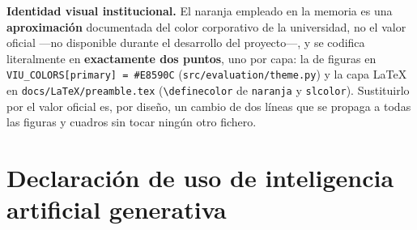 \begin{sloppypar}
\textbf{Identidad visual institucional.} El naranja empleado en la memoria es una
\textbf{aproximación} documentada del color corporativo de la universidad, no el valor
oficial ---no disponible durante el desarrollo del proyecto---, y se codifica literalmente
en \textbf{exactamente dos puntos}, uno por capa: la de figuras en
\texttt{VIU\_COLORS[\textquotedbl{}primary\textquotedbl{}] = \textquotedbl{}\#E8590C\textquotedbl{}}
(\texttt{src/\allowbreak{}evaluation/\allowbreak{}theme.py}) y la capa \LaTeX{} en
\texttt{docs/\allowbreak{}LaTeX/\allowbreak{}preamble.tex} (\texttt{\textbackslash{}definecolor} de \texttt{naranja} y
\texttt{slcolor}). Sustituirlo por el valor oficial es, por diseño, un cambio de dos
líneas que se propaga a todas las figuras y cuadros sin tocar ningún otro fichero.
\end{sloppypar}

\chapter{Declaración de uso de inteligencia artificial generativa}\label{cap:anexo4}

